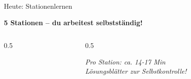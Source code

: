 \documentclass[aspectratio=169, 11pt]{beamer}
\begin{document}

\begin{frame}{Heute: Stationenlernen}
    \begin{center}
        \textbf{5 Stationen -- du arbeitest selbstständig!}
    \end{center}

    \vspace{10pt}

    \begin{columns}
        \begin{column}{0.5\textwidth}

            \vspace{8pt}


            \vspace{8pt}

        \end{column}
        \begin{column}{0.5\textwidth}

            \vspace{8pt}


            \vspace{8pt}

            {\small\textit{Pro Station: ca. 14-17 Min}\\
            \textit{Lösungsblätter zur Selbstkontrolle!}}
        \end{column}
    \end{columns}
\end{frame}
\end{document}
